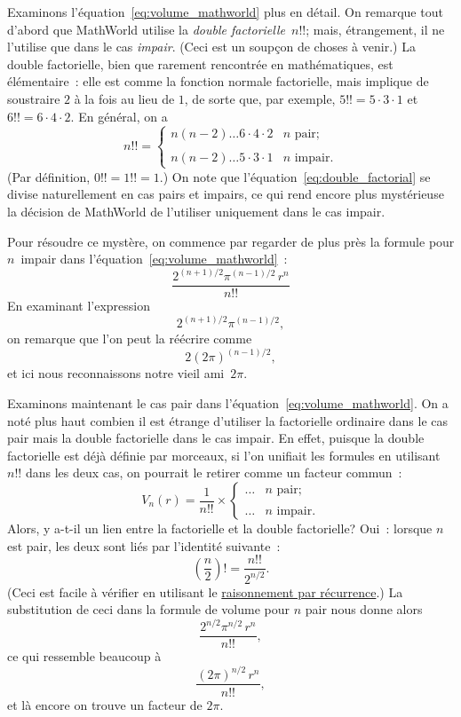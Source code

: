 Examinons l'équation~\eqref{eq:volume_mathworld} plus en détail. On
remarque tout d'abord que MathWorld utilise la
\emph{double factorielle}~$n!!$\ns; mais, étrangement, il ne l'utilise que dans le
cas \emph{impair}. (Ceci est un soupçon de choses à venir.) La double
factorielle, bien que rarement rencontrée en mathématiques, est élémentaire~:
elle est comme la fonction normale factorielle, mais implique de soustraire $2$
à la fois au lieu de $1$, de sorte que, par exemple, $5!! = 5 \cdot 3 \cdot 1$
et $6!! = 6 \cdot 4 \cdot 2$. En général, on a
\begin{equation}
\label{eq:double_factorial}
n!! = \begin{cases}
n(n-2)\ldots6\cdot4\cdot2 & n \text{ pair}; \\ \\
n(n-2)\ldots5\cdot3\cdot1 & n \text{ impair}.
\end{cases}
\end{equation}
(Par définition, $0!! =1!! = 1$.) On note que
l'équation~\eqref{eq:double_factorial} se divise naturellement en cas pairs et
impairs, ce qui rend encore plus mystérieuse la décision de MathWorld de
l'utiliser uniquement dans le cas impair.

Pour résoudre ce mystère, on commence par regarder de plus près la formule
pour $n$~impair dans l'équation~\eqref{eq:volume_mathworld}~:
\[ \frac{2^{(n+1)/2}\pi^{(n-1)/2}\,r^n}{n!!} \]
En examinant l'expression
\[ 2^{(n+1)/2}\pi^{(n-1)/2}, \]
on remarque que l'on peut la réécrire comme
\[ 2(2\pi)^{(n-1)/2}, \]
et ici nous reconnaissons notre vieil ami~$2\pi$.

Examinons maintenant le cas pair dans
l'équation~\eqref{eq:volume_mathworld}. On a noté plus haut combien il est
étrange d'utiliser la factorielle ordinaire dans le cas pair mais la double
factorielle dans le cas impair. En effet, puisque la double factorielle est déjà
définie par morceaux, si l'on unifiait les formules en utilisant $n!!$ dans les
deux cas, on pourrait le retirer comme un facteur commun~:
\[
V_n(r) = \frac{1}{n!!}\times \begin{cases}
\ldots & n \text{ pair}; \\ \\
 \ldots & n \text{ impair}.
 \end{cases}
\]
Alors, y a-t-il un lien entre la factorielle et la double factorielle\ns?
Oui~: lorsque $n$ est pair, les deux sont liés par l'identité suivante~:
\[ \left(\frac{n}{2}\right)! = \frac{n!!}{2^{n/2}}. \]
(Ceci est facile à vérifier en utilisant le
\href{https://fr.wikipedia.org/wiki/Raisonnement_par_récurrence}{raisonnement
par récurrence}.) La substitution de ceci dans la formule de volume pour $n$
pair nous donne alors
\[ \frac{2^{n/2}\pi^{n/2}\,r^n}{n!!}, \]
ce qui ressemble beaucoup à
\[ \frac{(2\pi)^{n/2}\,r^n}{n!!}, \]
et là encore on trouve un facteur de $2\pi$.

